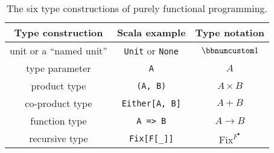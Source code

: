 \begin{wraptable}{l}{0.58\columnwidth}%
\begin{centering}
\vspace{-0.2\baselineskip}
\begin{tabular}{|c|c|c|}
\hline 
\textbf{\small{}Type construction} & \textbf{\small{}Scala example} & \textbf{\small{}Type notation}\tabularnewline
\hline 
\hline 
{\small{}unit or a \textsf{``}named unit\textsf{''}} & {\small{}}\lstinline!Unit!{\small{} or }\lstinline!None!{\small{} } & {\small{}$\bbnum 1$}\tabularnewline
\hline 
{\small{}type parameter} & {\small{}}\lstinline!A! & {\small{}$A$}\tabularnewline
\hline 
{\small{}product type} & {\small{}}\lstinline!(A, B)! & {\small{}$A\times B$}\tabularnewline
\hline 
{\small{}co-product type} & {\small{}}\lstinline!Either[A, B]! & {\small{}$A+B$}\tabularnewline
\hline 
{\small{}function type} & {\small{}}\lstinline!A => B! & {\small{}$A\rightarrow B$}\tabularnewline
\hline 
{\small{}recursive type} & {\small{}}\lstinline!Fix[F[_]]! & {\small{}$\text{Fix}^{F^{\bullet}}$}\tabularnewline
\hline 
\end{tabular}
\par\end{centering}
\caption{The six type constructions
of purely functional programming.\label{tab:six-pure-type-constructions}}
\vspace{-0.2\baselineskip}
\end{wraptable}%

